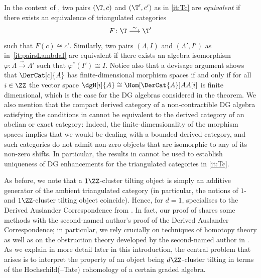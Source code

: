 \documentclass[a4paper]{amsart}
\begin{document}
In the context of , two pairs $(\T,c)$ and $(\T',c')$ as in
\eqref{it:Tc} are \emph{equivalent} if
there exists an equivalence of triangulated categories
\[
  F\colon\T\stackrel{\sim}{\longrightarrow}\T'
\]
such that $F(c)\cong c'$. Similarly, two pairs $(\Lambda,I)$ and $(\Lambda',I')$
as in~\eqref{it:pairsLambdaI} are equivalent if there exists an algebra
isomorphism $\varphi\colon\Lambda\stackrel{\sim}{\to}\Lambda'$ such that
$\varphi^*(I')\cong I$. Notice also that a devisage argument shows that
$\DerCat[c]{A}$ has finite-dimensional morphism spaces if and only if
for all $i\in\ZZ$ the vector space $\dgH[i]{A}\cong\Hom[\DerCat{A}]{A}{A[i]}$ is
finite dimensional, which is the case for the DG algebras considered in the
theorem. We also mention that the compact derived category of a non-contractible DG algebra
satisfying the conditions in  cannot be
equivalent to the derived category of an abelian or exact category: Indeed,
the finite-dimensionality of the morphism spaces implies that we would be
dealing with a bounded derived category, and such categories do not admit
non-zero objects that are isomorphic to any of its non-zero shifts. In
particular, the results in \cite{CNS22} cannot be used to establish uniqueness
of DG enhancements for the triangulated categories in \eqref{it:Tc}.

As before, we note that a $1\ZZ$-cluster tilting object is simply an additive
generator of the ambient triangulated category (in particular, the notions of
$1$- and $1\ZZ$-cluster tilting object coincide). Hence, for $d=1$,
 specialises to the Derived Auslander
Correspondence from \cite{Mur22}. In fact, our proof of
 shares some methods with the second-named author's proof of the Derived Auslander
Correspondence; in particular, we rely crucially on techniques of homotopy
theory as well as on the obstruction theory developed by the second-named author
in \cite{Mur20a}. As we explain in more detail later in this
introduction, the central problem that arises is to interpret the property of an object being
$d\ZZ$-cluster tilting in terms of the Hochschild(--Tate) cohomology of a
certain graded algebra.
\end{document}
